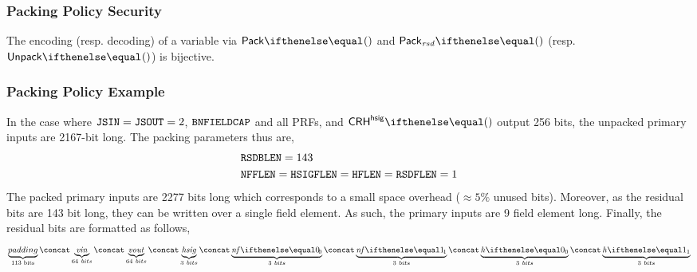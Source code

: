 \subsubsection{Packing Policy Security}
\begin{proposition}
    The encoding (resp. decoding) of a variable via $\pack{}{}$ and $\packResBits{}$ (resp. $\unpack{}{}$) is bijective.
\end{proposition}

\subsubsection{Packing Policy Example}
    
In the case where $\mathtt{JSIN}=\mathtt{JSOUT}=2$, $\mathtt{BNFIELDCAP}$ and all PRFs, and $\crhhsig{}$ output 256 bits, the unpacked primary inputs are 2167-bit long. The packing parameters thus are, 
\begin{align*}
    & \mathtt{RSDBLEN} = 143 \\
    & \mathtt{NFFLEN} = \mathtt{HSIGFLEN} = \mathtt{HFLEN} = \mathtt{RSDFLEN} = 1 
\end{align*}
The packed primary inputs are 2277 bits long which corresponds to a small space overhead ($\approx 5\%$ unused bits). Moreover, as the residual bits are 143 bit long, they can be written over a single field element. As such, the primary inputs are 9 field element long.
Finally, the residual bits are formatted as follows,
\[
    \underbrace{padding}_{\text{113 bits}} \concat \underbrace{\vin}_{64\ bits} \concat \underbrace{\vout}_{64\ bits} \concat \underbrace{\hsig}_{3\ bits} \concat \underbrace{\nf{0}}_{3\ bits} \concat \underbrace{\nf{1}}_{3\ bits} \concat \underbrace{\htag{0}}_{3\ bits} \concat \underbrace{\htag{1}}_{3\ bits}
\]
